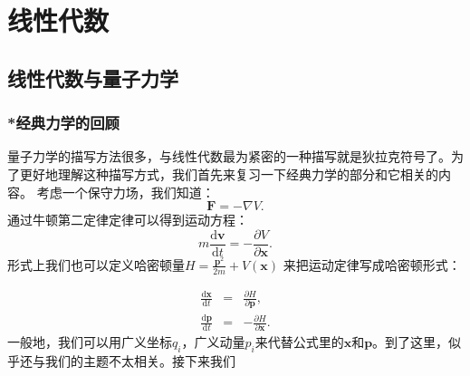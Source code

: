 \documentclass[../main.tex]{subfiles}
\begin{document}
\setcounter{chapter}{2}
\chapter{线性代数}\label{cha:linear_algebra}
\section{线性代数与量子力学}
\subsection{*经典力学的回顾}
    量子力学的描写方法很多，与线性代数最为紧密的一种描写就是狄拉克符号了。为了更好地理解这种描写方式，我们首先来复习一下经典力学的部分和它相关的内容。
    考虑一个保守力场，我们知道：
    \begin{equation}
        \mathbf{F}= -\nabla V.
    \end{equation}
    通过牛顿第二定律定律可以得到运动方程：
    \begin{equation}
        m\frac{\text{d}\mathbf{v}}{\text{d}t} = -\frac{\partial  V}{\partial \mathbf{x}}.
    \end{equation}
    形式上我们也可以定义哈密顿量$H = \frac{\mathbf{p}^2}{2 m}+ V(\mathbf{x}) $ 来把运动定律写成哈密顿形式：

    \begin{eqnarray}
        \frac{\text{d}\mathbf{x}}{\text{d}t} &=&\frac{\partial  H}{\partial \mathbf{p}}, \\ \frac{\text{d}\mathbf{p}}{\text{d}t} &=& - \frac{\partial  H}{\partial \mathbf{x}}.  
    \end{eqnarray}
    一般地，我们可以用广义坐标$q_i$，广义动量$p_i$来代替公式里的$\mathbf{x}$和$\mathbf{p}$。到了这里，似乎还与我们的主题不太相关。接下来我们
\biblio
\end{document}
